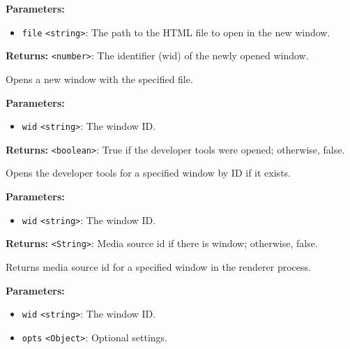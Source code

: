 \documentclass[12pt,a4paper]{article}
\begin{document}
\noindent \textbf{Parameters:}
\begin{itemize}
  \item \texttt{file} \texttt{<string>}: The path to the HTML file to open in the new window.
\end{itemize}

\noindent \textbf{Returns:} \texttt{<number>}: The identifier (wid) of the newly opened window.

\noindent Opens a new window with the specified file.

\vspace{5mm}
\noindent {}


\noindent \textbf{Parameters:}
\begin{itemize}
  \item \texttt{wid} \texttt{<string>}: The window ID.
\end{itemize}

\noindent \textbf{Returns:} \texttt{<boolean>}: True if the developer tools were opened; otherwise, false.

\noindent Opens the developer tools for a specified window by ID if it exists.

\vspace{5mm}
\noindent {}


\noindent \textbf{Parameters:}
\begin{itemize}
  \item \texttt{wid} \texttt{<string>}: The window ID.
\end{itemize}

\noindent \textbf{Returns:} \texttt{<String>}: Media source id if there is window; otherwise, false.

\noindent Returns media source id for a specified window in the renderer process.

\vspace{5mm}
\noindent {}


\noindent \textbf{Parameters:}
\begin{itemize}
  \item \texttt{wid} \texttt{<string>}: The window ID.
  \item \texttt{opts} \texttt{<Object>}: Optional settings.
\end{itemize}
\end{document}
